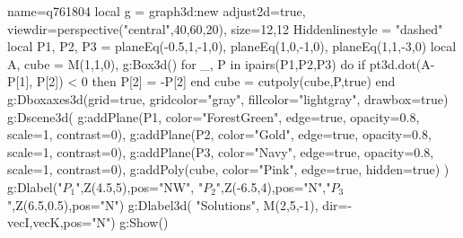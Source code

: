 \documentclass[border=5pt]{standalone}%
\begin{document}
\begin{luadraw}{name=q761804}
local g = graph3d:new{ adjust2d=true, viewdir=perspective("central",40,60,20), size={12,12}}
Hiddenlinestyle = "dashed"
local P1, P2, P3 = planeEq(-0.5,1,-1,0), planeEq(1,0,-1,0), planeEq(1,1,-3,0)
local A, cube = M(1,1,0), g:Box3d()
for _, P in ipairs({P1,P2,P3}) do
    if pt3d.dot(A-P[1], P[2]) < 0 then P[2] = -P[2] end
    cube = cutpoly(cube,P,true)
end
g:Dboxaxes3d({grid=true, gridcolor="gray", fillcolor="lightgray", drawbox=true})
g:Dscene3d(
    g:addPlane(P1, {color="ForestGreen", edge=true, opacity=0.8, scale=1, contrast=0}),
    g:addPlane(P2, {color="Gold", edge=true, opacity=0.8, scale=1, contrast=0}),
    g:addPlane(P3, {color="Navy", edge=true, opacity=0.8, scale=1, contrast=0}),
    g:addPoly(cube, {color="Pink", edge=true, hidden=true}) )
g:Dlabel("$P_1$",Z(4.5,5),{pos="NW"}, "$P_2$",Z(-6.5,4),{pos="N"},"$P_3$",Z(6.5,0.5),{pos="N"})
g:Dlabel3d( "Solutions", M(2,5,-1), {dir={-vecI,vecK},pos="N"})
g:Show()
\end{luadraw}
\end{document}
